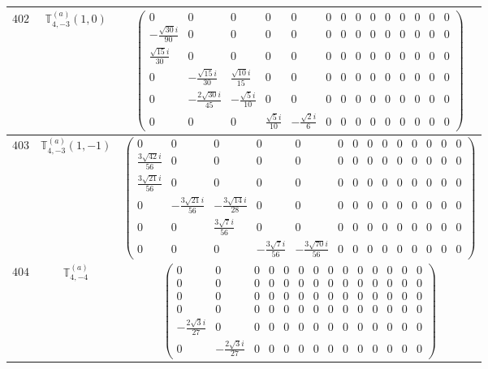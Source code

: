\documentclass[fleqn,8pt,landscape]{jsarticle}
\begin{document}
\begin{center}
\begin{longtable}{ccc}
$ 402 $ & $ \mathbb{T}_{4,-3}^{(a)}(1,0) $ & $ \begin{pmatrix} 0 & 0 & 0 & 0 & 0 & 0 & 0 & 0 & 0 & 0 & 0 & 0 & 0 & 0 \\ - \frac{\sqrt{30} i}{90} & 0 & 0 & 0 & 0 & 0 & 0 & 0 & 0 & 0 & 0 & 0 & 0 & 0 \\ \frac{\sqrt{15} i}{30} & 0 & 0 & 0 & 0 & 0 & 0 & 0 & 0 & 0 & 0 & 0 & 0 & 0 \\ 0 & - \frac{\sqrt{15} i}{30} & \frac{\sqrt{10} i}{15} & 0 & 0 & 0 & 0 & 0 & 0 & 0 & 0 & 0 & 0 & 0 \\ 0 & - \frac{2 \sqrt{30} i}{45} & - \frac{\sqrt{5} i}{10} & 0 & 0 & 0 & 0 & 0 & 0 & 0 & 0 & 0 & 0 & 0 \\ 0 & 0 & 0 & \frac{\sqrt{5} i}{10} & - \frac{\sqrt{2} i}{6} & 0 & 0 & 0 & 0 & 0 & 0 & 0 & 0 & 0 \end{pmatrix} $ \\ \hline
$ 403 $ & $ \mathbb{T}_{4,-3}^{(a)}(1,-1) $ & $ \begin{pmatrix} 0 & 0 & 0 & 0 & 0 & 0 & 0 & 0 & 0 & 0 & 0 & 0 & 0 & 0 \\ \frac{3 \sqrt{42} i}{56} & 0 & 0 & 0 & 0 & 0 & 0 & 0 & 0 & 0 & 0 & 0 & 0 & 0 \\ \frac{3 \sqrt{21} i}{56} & 0 & 0 & 0 & 0 & 0 & 0 & 0 & 0 & 0 & 0 & 0 & 0 & 0 \\ 0 & - \frac{3 \sqrt{21} i}{56} & - \frac{3 \sqrt{14} i}{28} & 0 & 0 & 0 & 0 & 0 & 0 & 0 & 0 & 0 & 0 & 0 \\ 0 & 0 & \frac{3 \sqrt{7} i}{56} & 0 & 0 & 0 & 0 & 0 & 0 & 0 & 0 & 0 & 0 & 0 \\ 0 & 0 & 0 & - \frac{3 \sqrt{7} i}{56} & - \frac{3 \sqrt{70} i}{56} & 0 & 0 & 0 & 0 & 0 & 0 & 0 & 0 & 0 \end{pmatrix} $ \\ \hline
$ 404 $ & $ \mathbb{T}_{4,-4}^{(a)} $ & $ \begin{pmatrix} 0 & 0 & 0 & 0 & 0 & 0 & 0 & 0 & 0 & 0 & 0 & 0 & 0 & 0 \\ 0 & 0 & 0 & 0 & 0 & 0 & 0 & 0 & 0 & 0 & 0 & 0 & 0 & 0 \\ 0 & 0 & 0 & 0 & 0 & 0 & 0 & 0 & 0 & 0 & 0 & 0 & 0 & 0 \\ 0 & 0 & 0 & 0 & 0 & 0 & 0 & 0 & 0 & 0 & 0 & 0 & 0 & 0 \\ - \frac{2 \sqrt{3} i}{27} & 0 & 0 & 0 & 0 & 0 & 0 & 0 & 0 & 0 & 0 & 0 & 0 & 0 \\ 0 & - \frac{2 \sqrt{3} i}{27} & 0 & 0 & 0 & 0 & 0 & 0 & 0 & 0 & 0 & 0 & 0 & 0 \end{pmatrix} $ \\ \hline

\end{longtable}
\end{center}
\end{document}
